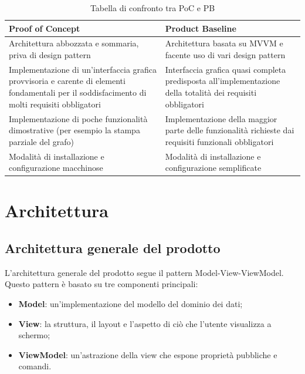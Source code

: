 \documentclass[openany,12pt,a4paper]{report}
\begin{document}
	\begin{longtable}{|p{70mm}|p{70mm}|}
		\caption {Tabella di confronto tra PoC e PB} \label{tab:Tabella di confronto tra PoC e PB} \\
		\hline
		\textbf{Proof of Concept} & \textbf{Product Baseline} \\
		
		\hline Architettura abbozzata e sommaria, priva di design pattern 
		&
		Architettura basata su MVVM e facente uso di vari design pattern \\ 
		
		\hline Implementazione di un'interfaccia grafica provvisoria e carente di elementi fondamentali per il soddisfacimento di molti requisiti obbligatori 
		&
		Interfaccia grafica quasi completa predisposta all'implementazione della totalità dei requisiti obbligatori \\ 
		
		\hline Implementazione di poche funzionalità dimostrative (per esempio la stampa parziale del grafo)
		&
		Implementazione della maggior parte delle funzionalità richieste dai requisiti funzionali obbligatori \\ 
		
		\hline Modalità di installazione e configurazione macchinose
		&
		Modalità di installazione e configurazione semplificate \\ 
		\hline
	\end{longtable}

	\chapter{Architettura}
	
	\section{Architettura generale del prodotto}
	
	L'architettura generale del prodotto segue il pattern Model-View-ViewModel. Questo pattern è basato su tre componenti principali:
	
	\begin{itemize}
		\item \textbf{Model}: un'implementazione del modello del dominio dei dati;
		\item \textbf{View}: la struttura, il layout e l'aspetto di ciò che l'utente visualizza a schermo;
		\item \textbf{ViewModel}: un'astrazione della view che espone proprietà pubbliche e comandi.
	\end{itemize}
	
\end{document}
